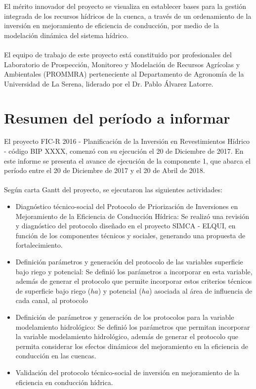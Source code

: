 \documentclass[]{article}
\begin{document}
El mérito innovador del proyecto se visualiza en establecer bases para la gestión integrada de los recursos hídricos de la cuenca, a través de un ordenamiento de la inversión en mejoramiento de eficiencia de conducción, por medio de la modelación dinámica del sistema hídrico.\\
\\
El equipo de trabajo de este proyecto está constituido por profesionales del Laboratorio de Prospección, Monitoreo y Modelación de Recursos Agrícolas y Ambientales (PROMMRA) perteneciente al Departamento de Agronomía de la Universidad de La Serena, liderado por el Dr. Pablo Álvarez Latorre.\\
\clearpage

\section{Resumen del período a informar}

El proyecto FIC-R 2016 - Planificación de la Inversión en Revestimientos Hídrico - código BIP XXXX, comenzó con su ejecución el 20 de Diciembre de 2017. En este informe se presenta el avance de ejecución de la componente 1, que abarca el período entre el 20 de Diciembre de 2017 y el 20 de Abril de 2018.\\
\\
Según carta Gantt del proyecto, se ejecutaron las siguientes actividades:
\begin{itemize}
\item Diagnóstico técnico-social del Protocolo de Priorización de Inversiones en Mejoramiento de la Eficiencia de Conducción Hídrica: Se realizó una revisión y diagnóstico del protocolo diseñado en el proyecto SIMCA - ELQUI, en función de los componentes técnicos y sociales, generando una propuesta de fortalecimiento.
\item Definición parámetros y generación del protocolo de las variables superficie bajo riego y potencial: Se definió los parámetros a incorporar en esta variable, además de generar el protocolo que permite incorporar estos criterios técnicos de superficie bajo riego ($ha$) y potencial ($ha$) asociada al área de influencia de cada canal, al protocolo 
\item Definición de parámetros y generación de los protocolos para la variable modelamiento hidrológico: Se definió los parámetros que permitan incorporar la variable modelamiento hidrológico, además de generar el protocolo que permita considerar los efectos dinámicos del mejoramiento en la eficiencia de conducción en las cuencas.
\item Validación del protocolo técnico-social de inversión en mejoramiento de la eficiencia en conducción hídrica.
\end{itemize}
\end{document}

